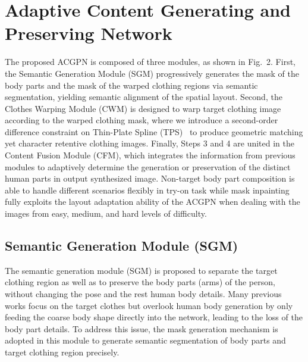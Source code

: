 \documentclass[10pt,twocolumn,letterpaper]{article}
\begin{document}
\section{Adaptive Content Generating and Preserving Network}
The proposed ACGPN is composed of three modules, as shown in Fig.~2. First, the Semantic Generation Module (SGM)  progressively generates the mask of the body parts and the mask of the warped clothing regions via semantic segmentation, yielding semantic alignment of the spatial layout.
Second, the Clothes Warping Module (CWM) is designed to warp target clothing  image according to the warped clothing mask, where we introduce a second-order difference constraint on Thin-Plate Spline (TPS)~\cite{duchon1977splines}  to produce geometric matching yet character retentive clothing  images.
Finally, Steps 3 and 4 are united in the Content Fusion Module (CFM), which integrates the information from previous modules to adaptively determine the generation or preservation of the distinct human parts in output synthesized image. Non-target body part composition is able to handle different scenarios flexibly in try-on task while mask inpainting fully exploits the layout adaptation ability of the ACGPN when dealing with the images from easy, medium, and hard levels of difficulty.









\subsection{Semantic Generation Module (SGM)}

The semantic generation module (SGM) is proposed to separate the target clothing region as well as to preserve the body parts (\ie arms) of the person, without changing the pose and the rest human body details.
Many previous works focus on the target clothes but overlook human body generation by only feeding the coarse body shape directly into the network, leading to the loss of the body part details. To address this issue, the mask generation mechanism is adopted in this module to generate semantic segmentation of body parts and target clothing region precisely.
\end{document}
